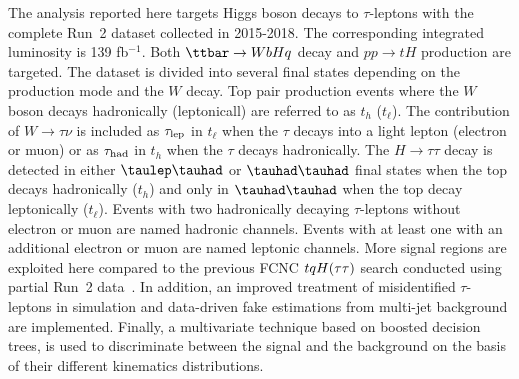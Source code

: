 
The analysis reported here targets Higgs boson decays to 
$\tau$-leptons with the complete Run~2 dataset collected in 2015-2018. The corresponding integrated luminosity is 139 fb$^{-1}$. Both $\ttbar \to WbHq$ decay and $pp \to tH$ production are targeted. The dataset is divided into several final states depending on the production mode and
the  $W$ decay. Top pair production events where the $W$ boson decays hadronically (leptonicall) are referred to as $t_h$ ($t_{\ell}$). The contribution of 
$W\rightarrow\tau\nu$ is included as $\tau_{\mathrm{lep}}$ in $t_{\ell}$ when the $\tau$ decays into a light lepton (electron or muon) or as $\tau_\text{had}$ 
in $t_h$ when the $\tau$ decays hadronically.
The $H\rightarrow \tau\tau$ decay is detected in
either $\tlhad$ or $\thadhad$ final states when the top decays hadronically ($t_h$) and only in $\thadhad$ when the top decay leptonically ($t_{\ell}$). 
Events with two hadronically decaying $\tau$-leptons without electron or muon are named hadronic channels. Events with at least one \tauhad with an additional electron or muon are named leptonic channels. More signal regions are exploited here compared to the previous FCNC $tqH(\tau\tau)$ search conducted using partial Run~2 data~\cite{fcnc36}.
In addition, an improved treatment of misidentified $\tau$-leptons in simulation and data-driven
fake estimations from multi-jet background are implemented.
Finally, a multivariate technique based on boosted decision trees, is used to discriminate between the signal and the background on the basis of their different kinematics distributions. 

